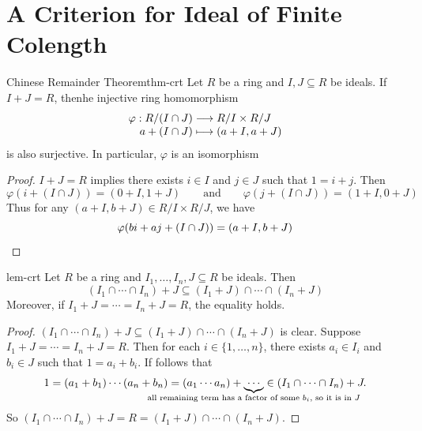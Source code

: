 \documentclass[a4paper,10pt]{article}
\theoremstyle{definition}
\begin{document}
\section{A Criterion for Ideal of Finite Colength}
\begin{theorem}{Chinese Remainder Theorem}{thm-crt}
Let $R$ be a ring and $I,J\subseteq R$ be ideals.
If $I+J=R$, thenhe injective ring homomorphism 
\begin{equation*}\begin{array}{r@{}c@{}l}
\varphi:R/(I\cap J)&{}\longrightarrow{}&R/I\times R/J\\
a+(I\cap J)&{}\longmapsto{}&(a+I,a+J)
\end{array}\end{equation*}
is also surjective.
In particular, $\varphi$ is an isomorphism
\end{theorem}
\begin{proof}
$I+J=R$ implies there exists $i\in I$ and $j\in J$ such that $1=i+j$.
Then 
\begin{equation*}
\varphi(i+(I\cap J))=(0+I,1+J)\qquad\text{and}\qquad
\varphi(j+(I\cap J))=(1+I,0+J)
\end{equation*}
Thus for any $(a+I,b+J)\in R/I\times R/J$, we have
\begin{equation*}
\varphi(bi+aj+(I\cap J))=(a+I,b+J)\qedhere
\end{equation*}
\end{proof}

\begin{lemma}{}{lem-crt}
Let $R$ be a ring and $I_1,\dots,I_n,J\subseteq R$ be ideals.
Then 
\begin{equation*}
(I_1\cap\cdots\cap I_n)+J\subseteq(I_1+J)\cap\cdots\cap(I_n+J)
\end{equation*}
Moreover, if $I_1+J=\cdots=I_n+J=R$, the equality holds.
\end{lemma}
\begin{proof}
$(I_1\cap\cdots\cap I_n)+J\subseteq(I_1+J)\cap\cdots\cap(I_n+J)$ is clear.
Suppose $I_1+J=\cdots=I_n+J=R$.
Then for each $i\in\{1,\dots,n\}$, there exists $a_i\in I_i$ and $b_i\in J$
such that $1=a_i+b_i$.
If follows that
\begin{equation*}
1=(a_1+b_1)\cdots(a_n+b_n)=(a_1\cdots a_n)+
\underbrace{\cdots}_{\mathmakebox[0pt][c]
{\text{all remaining term has a factor of some $b_i$, so it is in $J$}}}
\in(I_1\cap\cdots\cap I_n)+J.
\end{equation*}
So $(I_1\cap\cdots\cap I_n)+J=R=(I_1+J)\cap\cdots\cap(I_n+J)$.
\end{proof}
\end{document}
